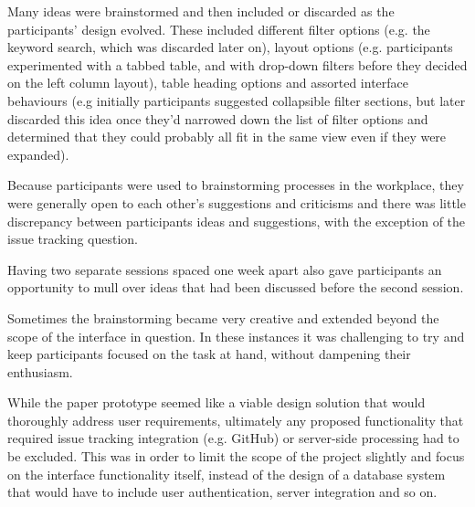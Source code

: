 Many ideas were brainstormed and then included or discarded as the participants' design evolved. These included different filter options (e.g. the keyword search, which was discarded later on), layout options (e.g. participants experimented with a tabbed table, and with drop-down filters before they decided on the left column layout), table heading options and assorted interface behaviours (e.g initially participants suggested collapsible filter sections, but later discarded this idea once they'd narrowed down the list of filter options and determined that they could probably all fit in the same view even if they were expanded).  

Because participants were used to brainstorming processes in the workplace, they were generally open to each other's suggestions and criticisms and there was little discrepancy between participants ideas and suggestions, with the exception of the issue tracking question. 

Having two separate sessions spaced one week apart also gave participants an opportunity to mull over ideas that had been discussed before the second session. 

Sometimes the brainstorming became very creative and extended beyond the scope of the interface in question. In these instances it  was challenging to try and keep participants focused on the task at hand, without dampening their enthusiasm. 

While the paper prototype seemed like a viable design solution that would thoroughly address user requirements, ultimately any proposed functionality that required issue tracking integration (e.g. GitHub) or server-side processing had to be excluded. This was in order to limit the scope of the project slightly and focus on the interface functionality itself, instead of the design of a database system that would have to include user authentication, server integration and so on. 
